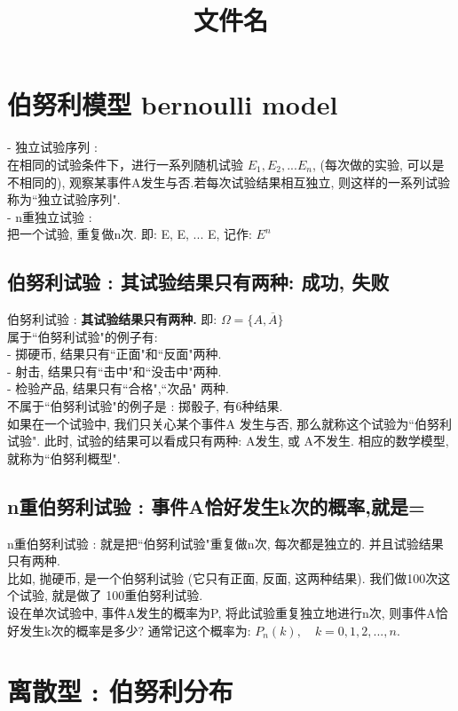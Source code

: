 \documentclass[UTF8]{ctexart}
\title{文件名}
\begin{document}
	\tableofcontents %
	\date{} %
	\maketitle  %
	
	
	
	\section{伯努利模型 bernoulli model}
	
	- 独立试验序列 :  \\
	在相同的试验条件下，进行一系列随机试验 $ E_1, E_2, ... E_n$, (每次做的实验, 可以是不相同的), 观察某事件A发生与否.若每次试验结果相互独立, 则这样的一系列试验称为``独立试验序列". \\
	
	- n重独立试验 : \\
	把一个试验, 重复做n次. 即:   E, E, ... E, 记作: $ E^n$ \\
	
	
	
	\subsection{伯努利试验 : 其试验结果只有两种: 成功, 失败}
	
	伯努利试验 :  \textbf{其试验结果只有两种.} 即: $ \Omega = \{A, \overline {A}\}$ \\
	
	属于``伯努利试验"的例子有: \\
	- 掷硬币, 结果只有``正面"和``反面"两种. \\
	- 射击, 结果只有``击中"和``没击中"两种.  \\
	- 检验产品, 结果只有``合格",``次品" 两种. \\
	
	不属于``伯努利试验"的例子是 : 掷骰子, 有6种结果. \\
	
	如果在一个试验中, 我们只关心某个事件A 发生与否, 那么就称这个试验为``伯努利试验". 此时, 试验的结果可以看成只有两种: A发生, 或 A不发生.  相应的数学模型, 就称为``伯努利概型". \\
	
	
	\subsection{ n重伯努利试验 : 事件A恰好发生k次的概率,就是= }
	
	n重伯努利试验 : 	就是把``伯努利试验"重复做n次, 每次都是独立的. 并且试验结果只有两种. \\
	比如, 抛硬币, 是一个伯努利试验 (它只有正面, 反面, 这两种结果). 我们做100次这个试验, 就是做了 100重伯努利试验. \\
	
	设在单次试验中, 事件A发生的概率为P, 将此试验重复独立地进行n次, 则事件A恰好发生k次的概率是多少? 通常记这个概率为: $ P_n(k), \quad  k= 0,1,2,...,n$.
	
	
	
		
	
	\section{离散型 : 伯努利分布}
	
	
	
	
	
	
\end{document}
